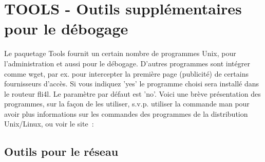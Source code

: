 
{
\section{TOOLS - Outils supplémentaires pour le débogage}
}

    Le paquetage Tools fournit un certain nombre de programmes Unix, pour
    l'administration et aussi pour le débogage. D'autres programmes sont
    intégrer comme wget, par ex. pour intercepter la première page (publicité)
    de certains fournisseurs d'accès. Si vous indiquez 'yes' le programme choisi
    sera installé dans le routeur fli4l. Le paramètre par défaut est 'no'. Voici
    une brève présentation des programmes, sur la façon de les utiliser, s.v.p.
    utiliser la commande man pour avoir plus informations sur les commandes des
    programmes de la distribution Unix/Linux, ou voir le site~:

\subsection{Outils pour le réseau}

